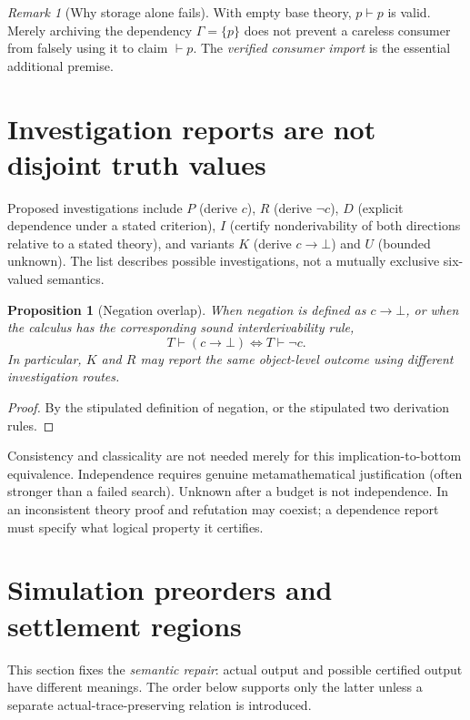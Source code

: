 \documentclass[11pt,letterpaper]{article}
\newtheorem{proposition}[definition]{Proposition}
\theoremstyle{remark}
\newtheorem{remark}[definition]{Remark}
\begin{document}
\begin{remark}[Why storage alone fails]
With empty base theory, $p\vdash p$ is valid. Merely archiving the dependency $\Gamma=\{p\}$ does not prevent a careless consumer from falsely using it to claim $\vdash p$. The \emph{verified consumer import} is the essential additional premise.
\end{remark}

\section{Investigation reports are not disjoint truth values}
Proposed investigations include $P$ (derive $c$), $R$ (derive $\neg c$), $D$ (explicit dependence under a stated criterion), $I$ (certify nonderivability of both directions relative to a stated theory), and variants $K$ (derive $c\to\bot$) and $U$ (bounded unknown). The list describes possible investigations, not a mutually exclusive six-valued semantics.
\begin{proposition}[Negation overlap]\label{prop:negrole}
When negation is defined as $c\to\bot$, or when the calculus has the corresponding sound interderivability rule,
\[T\vdash(c\to\bot)\iff T\vdash\neg c.\]
In particular, $K$ and $R$ may report the same object-level outcome using different investigation routes.
\end{proposition}
\begin{proof}By the stipulated definition of negation, or the stipulated two derivation rules.\end{proof}
Consistency and classicality are not needed merely for this implication-to-bottom equivalence. Independence requires genuine metamathematical justification (often stronger than a failed search). Unknown after a budget is not independence. In an inconsistent theory proof and refutation may coexist; a dependence report must specify what logical property it certifies.

\section{Simulation preorders and settlement regions}
This section fixes the \emph{semantic repair}: actual output and possible certified output have different meanings. The order below supports only the latter unless a separate actual-trace-preserving relation is introduced.
\end{document}
